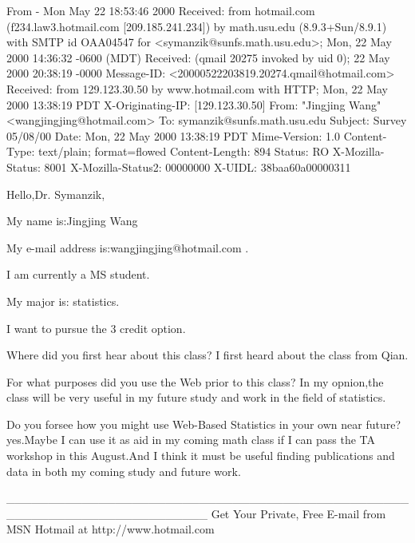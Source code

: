 From - Mon May 22 18:53:46 2000
Received: from hotmail.com (f234.law3.hotmail.com [209.185.241.234])
	by math.usu.edu (8.9.3+Sun/8.9.1) with SMTP id OAA04547
	for <symanzik@sunfs.math.usu.edu>; Mon, 22 May 2000 14:36:32 -0600 (MDT)
Received: (qmail 20275 invoked by uid 0); 22 May 2000 20:38:19 -0000
Message-ID: <20000522203819.20274.qmail@hotmail.com>
Received: from 129.123.30.50 by www.hotmail.com with HTTP;
	Mon, 22 May 2000 13:38:19 PDT
X-Originating-IP: [129.123.30.50]
From: "Jingjing Wang" <wangjingjing@hotmail.com>
To: symanzik@sunfs.math.usu.edu
Subject: Survey 05/08/00
Date: Mon, 22 May 2000 13:38:19 PDT
Mime-Version: 1.0
Content-Type: text/plain; format=flowed
Content-Length: 894
Status: RO
X-Mozilla-Status: 8001
X-Mozilla-Status2: 00000000
X-UIDL: 38baa60a00000311

Hello,Dr. Symanzik,

My name is:Jingjing Wang

My e-mail address is:wangjingjing@hotmail.com .

I am currently a MS student.

My major is: statistics.

I want to pursue the 3 credit option.

Where did you first hear about this class?
I first heard about the class from Qian.

For what purposes did you use the Web prior to this class?
In my opnion,the class will be very useful in my future study       and work 
in the field of statistics.

Do you forsee how you might use Web-Based Statistics in your own near 
future?
yes.Maybe I can use it as aid in my coming math class if I can      pass the 
TA workshop in this August.And I think it must be           useful finding 
publications and data in both my coming study and      future work.




________________________________________________________________________
Get Your Private, Free E-mail from MSN Hotmail at http://www.hotmail.com

